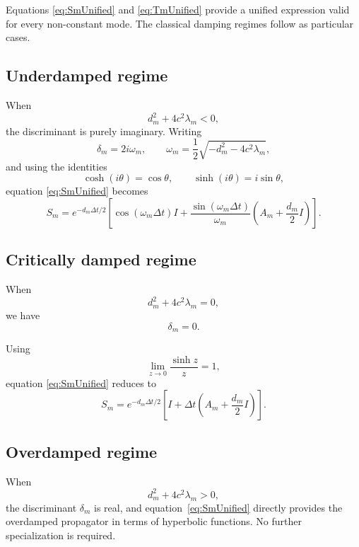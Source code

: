 \documentclass{Configuration_Files/PoliMi3i_thesis}
\begin{document}
Equations \eqref{eq:SmUnified} and \eqref{eq:TmUnified} provide a unified expression valid for every non-constant mode. The classical damping regimes follow as particular cases.

\subsection*{Underdamped regime}

When
\begin{equation*}
d_m^2+4c^2\lambda_m<0,
\end{equation*}
the discriminant is purely imaginary. Writing
\begin{equation*}
\delta_m
=
2i\omega_m,
\qquad
\omega_m
=
\frac12
\sqrt{-d_m^2-4c^2\lambda_m},
\end{equation*}
and using the identities
\begin{equation*}
\cosh(i\theta)=\cos\theta,
\qquad
\sinh(i\theta)=i\sin\theta,
\end{equation*}
equation \eqref{eq:SmUnified} becomes
\begin{equation*}
S_m
=
e^{-d_m\Delta t/2}
\left[
\cos(\omega_m\Delta t)I
+
\frac{\sin(\omega_m\Delta t)}
{\omega_m}
\left(
A_m+\frac{d_m}{2}I
\right)
\right].
\end{equation*}

\subsection*{Critically damped regime}

When
\begin{equation*}
d_m^2+4c^2\lambda_m=0,
\end{equation*}
we have
\begin{equation*}
\delta_m=0.
\end{equation*}

Using
\begin{equation*}
\lim_{z\to0}
\frac{\sinh z}{z}
=
1,
\end{equation*}
equation \eqref{eq:SmUnified} reduces to
\begin{equation*}
S_m
=
e^{-d_m\Delta t/2}
\left[
I
+
\Delta t
\left(
A_m+\frac{d_m}{2}I
\right)
\right].
\end{equation*}

\subsection*{Overdamped regime}

When
\begin{equation*}
d_m^2+4c^2\lambda_m>0,
\end{equation*}
the discriminant \(\delta_m\) is real, and equation~\eqref{eq:SmUnified} directly provides the overdamped propagator in terms of hyperbolic functions. No further specialization is required.
\end{document}
